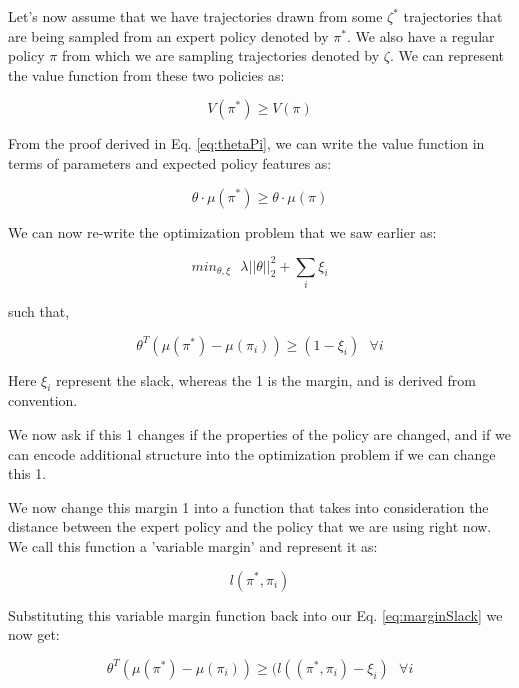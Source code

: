 \documentclass[11pt]{article}
\begin{document}
Let's now assume that we have trajectories drawn from some $\zeta^*$ trajectories that are being sampled from an expert policy denoted by $\pi^*$. We also have a regular policy $\pi$ from which we are sampling trajectories denoted by $\zeta$. We can represent the value function from these two policies as:

\begin{equation}
    V(\pi^*) \geq V(\pi)
\end{equation}

From the proof derived in Eq. \ref{eq:thetaPi}, we can write the value function in terms of parameters and expected policy features as:

\begin{equation}
    \theta \cdot \mu(\pi^*) \geq \theta \cdot \mu(\pi)
\end{equation}

We can now re-write the optimization problem that we saw earlier as:

\begin{equation}
    min_{\theta, \xi} \texttt{ } \lambda ||\theta||_{2}^2 + \sum_{i} \xi_{i}
\end{equation}

such that,

\begin{equation}
    \theta^T(\mu(\pi^*) - \mu(\pi_i)) \geq (1 - \xi_i) \texttt{ }\forall i
\label{eq:marginSlack}\end{equation}

Here $\xi_i$ represent the slack, whereas the 1 is the margin, and is derived from convention.

We now ask if this 1 changes if the properties of the policy are changed, and if we can encode additional structure into the optimization problem if we can change this 1.

We now change this margin 1 into a function that takes into consideration the distance between the expert policy and the policy that we are using right now. We call this function a 'variable margin' and represent it as:

\begin{equation}
    l(\pi^*, \pi_i)
\end{equation}

Substituting this variable margin function back into our Eq. \ref{eq:marginSlack} we now get:

\begin{equation}
    \theta^T(\mu(\pi^*) - \mu(\pi_i)) \geq (l((\pi^*, \pi_i) - \xi_i) \texttt{ }\forall i
\label{eq:newMarginSlack}\end{equation}
\end{document}
